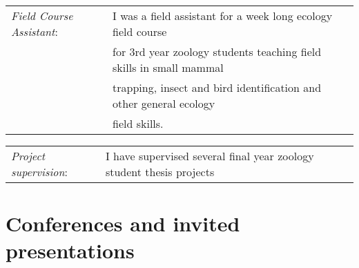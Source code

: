 \documentclass[10pt,a4paper]{article}
\begin{document}
\begin{tabular}{ll}
\textit{Field Course Assistant}:& I was a field assistant for a week long ecology field course\\ 
&for 3rd year zoology students teaching field skills in small mammal\\
&trapping, insect and bird identification and other general ecology\\
&field skills.
\end{tabular}

\begin{tabular}{ll}
\textit{Project supervision}:&\hspace{5.7mm} I have supervised several final year zoology student thesis projects\\

\end{tabular}





\section{Conferences and invited presentations}
\end{document}

